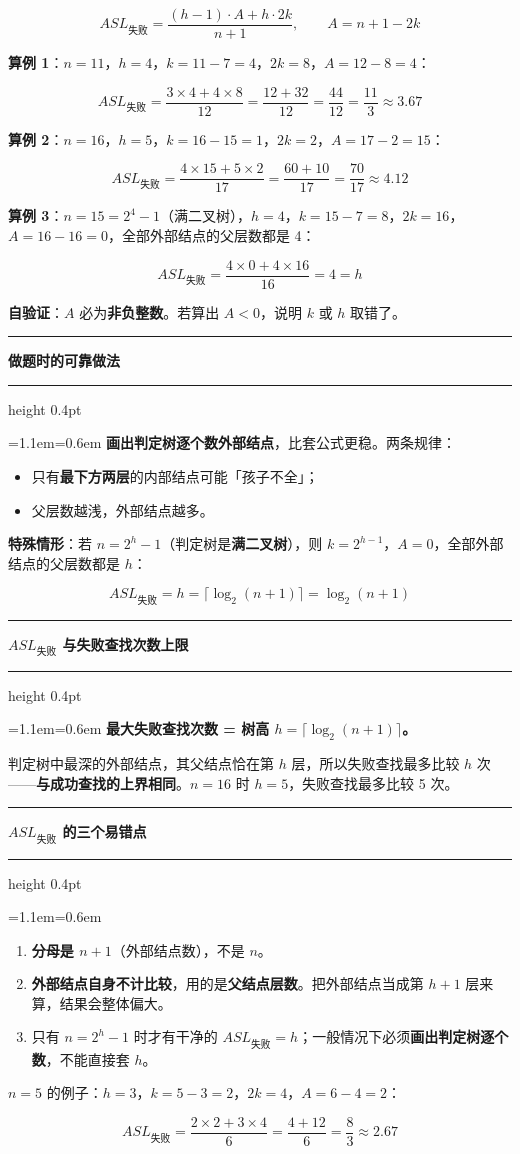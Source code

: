 \documentclass[11pt,openany,UTF8]{ctexbook}
\newcommand{\callouthead}[2]{%
  \par\addvspace{7pt}\noindent
  {\color{#1}\rule[-0.15em]{3pt}{1.05em}}\hspace{0.5em}%
  {\bfseries\color{#1}#2}\par\nobreak\vspace{-0.35em}%
  {\color{rulesep}\hrule height 0.4pt}\nobreak\vspace{0.45em}%
  \begingroup\small\setlength{\parindent}{0pt}%
  \leftskip=1.1em\rightskip=0.6em\noindent\ignorespaces}
\newcommand{\calloutend}{\par\endgroup\addvspace{7pt}}
\newenvironment{callkey}[1]{\callouthead{keybar}{#1}}{\calloutend}
\newenvironment{callwarn}[1]{\callouthead{warnbar}{#1}}{\calloutend}
\begin{document}
\[ASL_{失败}=\frac{(h-1)\cdot A+h\cdot 2k}{n+1},\qquad A=n+1-2k\]

\textbf{算例 1}：$n=11$，$h=4$，$k=11-7=4$，$2k=8$，$A=12-8=4$：

\[ASL_{失败}=\frac{3\times 4+4\times 8}{12}=\frac{12+32}{12}=\frac{44}{12}=\frac{11}{3}\approx 3.67\]

\textbf{算例 2}：$n=16$，$h=5$，$k=16-15=1$，$2k=2$，$A=17-2=15$：

\[ASL_{失败}=\frac{4\times 15+5\times 2}{17}=\frac{60+10}{17}=\frac{70}{17}\approx 4.12\]

\textbf{算例 3}：$n=15=2^4-1$（满二叉树），$h=4$，$k=15-7=8$，$2k=16$，$A=16-16=0$，全部外部结点的父层数都是 4：

\[ASL_{失败}=\frac{4\times 0+4\times 16}{16}=4=h\]

\textbf{自验证}：$A$ 必为\textbf{非负整数}。若算出 $A<0$，说明 $k$ 或 $h$ 取错了。

\begin{callkey}{做题时的可靠做法}
\textbf{画出判定树逐个数外部结点}，比套公式更稳。两条规律：

\begin{itemize}
\item 只有\textbf{最下方两层}的内部结点可能「孩子不全」；
\item 父层数越浅，外部结点越多。
\end{itemize}
\end{callkey}

\textbf{特殊情形}：若 $n=2^{h}-1$（判定树是\textbf{满二叉树}），则 $k=2^{h-1}$，$A=0$，全部外部结点的父层数都是 $h$：

\[ASL_{失败}=h=\lceil \log_2(n+1)\rceil=\log_2(n+1)\]

\begin{callkey}{$ASL_{失败}$ 与失败查找次数上限}
\textbf{最大失败查找次数 = 树高 $h=\lceil\log_2(n+1)\rceil$。}

判定树中最深的外部结点，其父结点恰在第 $h$ 层，所以失败查找最多比较 $h$ 次——\textbf{与成功查找的上界相同}。$n=16$ 时 $h=5$，失败查找最多比较 5 次。

\end{callkey}

\begin{callwarn}{$ASL_{失败}$ 的三个易错点}
\begin{enumerate}
\item \textbf{分母是 $n+1$}（外部结点数），不是 $n$。
\item \textbf{外部结点自身不计比较}，用的是\textbf{父结点层数}。把外部结点当成第 $h+1$ 层来算，结果会整体偏大。
\item 只有 $n=2^{h}-1$ 时才有干净的 $ASL_{失败}=h$；一般情况下必须\textbf{画出判定树逐个数}，不能直接套 $h$。
\end{enumerate}
$n=5$ 的例子：$h=3$，$k=5-3=2$，$2k=4$，$A=6-4=2$：

\[ASL_{失败}=\frac{2\times 2+3\times 4}{6}=\frac{4+12}{6}=\frac{8}{3}\approx2.67\]

\end{callwarn}
\end{document}

